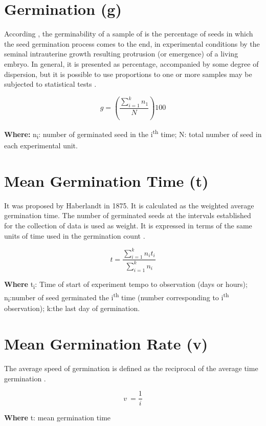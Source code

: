 \documentclass[]{book}
\begin{document}
\section{Germination (g)}\label{germination-g}

According \citet{GouveaLabouriau1983}, the germinability of a sample of
is the percentage of seeds in which the seed germination process comes
to the end, in experimental conditions by the seminal intrauterine
growth resulting protrusion (or emergence) of a living embryo. In
general, it is presented as percentage, accompanied by some degree of
dispersion, but it is possible to use proportions to one or more samples
may be subjected to statistical tests \citep{CARVALHO2005}.

\[ g=\left(\frac{\sum_{i=1}^kn_1}{N}\right)100 \]

\textbf{Where:} n\textsubscript{i}: number of germinated seed in the
i\textsuperscript{th} time; N: total number of seed in each experimental
unit.

\section{Mean Germination Time (t)}\label{mean-germination-time-t}

It was proposed by Haberlandt in 1875. It is calculated as the weighted
average germination time. The number of germinated seeds at the
intervals established for the collection of data is used as weight. It
is expressed in terms of the same units of time used in the germination
count \citep{Czabator1962}.

\[ t=\frac{\sum_{i=1}^kn_it_i}{\sum_{i=1}^kn_i} \]

\textbf{Where} t\textsubscript{i}: Time of start of experiment tempo to
observation (days or hours); n\textsubscript{i}:number of seed
germinated the i\textsuperscript{th} time (number corresponding to
i\textsuperscript{th} observation); k:the last day of germination.

\section{Mean Germination Rate (v)}\label{mean-germination-rate-v}

The average speed of germination is defined as the reciprocal of the
average time germination \citep{Ranal2006}.

\[ v\ =\frac{1}{i} \]

\textbf{Where} t: mean germination time
\end{document}
